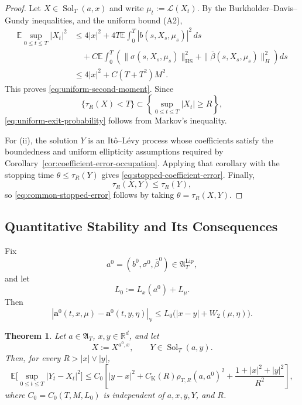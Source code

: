 \documentclass[12pt,oneside, reqno]{amsart}
\newtheorem{theorem}{Theorem}[section]
\numberwithin{equation}{section}
\begin{document}
	\begin{proof}
		Let $X\in\operatorname{Sol}_T(a,x)$ and write $\mu_t:=\mathcal L(X_t)$. By the Burkholder--Davis--Gundy	inequalities,	and the uniform bound \textnormal{(A2)},
		\[
		\begin{aligned}
			\mathbb E\sup_{0\leq t\leq T}|X_t|^2
			&\leq
			4|x|^2
			+
			4T\mathbb E\int_0^T
			|b(s,X_s,\mu_s)|^2\,ds
			\\
			&\quad+
			C\mathbb E\int_0^T
			\left(
			\|\sigma(s,X_s,\mu_s)\|_{\mathrm{HS}}^2
			+
			\|\overline\beta(s,X_s,\mu_s)\|_H^2
			\right)ds
			\\
			&\leq
			4|x|^2+C(T+T^2)M^2.
		\end{aligned}
		\]
		This proves \eqref{eq:uniform-second-moment}. Since
		\[
		\{\tau_R(X)<T\}
		\subset
		\left\{
		\sup_{0\leq t\leq T}|X_t|\geq R
		\right\},
		\]
		\eqref{eq:uniform-exit-probability} follows from Markov's
		inequality.
		
		For \textnormal{(ii)}, the solution $Y$ is an It\^o--L\'evy
		process whose coefficients satisfy the boundedness and uniform
		ellipticity assumptions required by
		Corollary~\ref{cor:coefficient-error-occupation}. Applying that
		corollary with the stopping time $\theta\leq\tau_R(Y)$ gives
		\eqref{eq:stopped-coefficient-error}. Finally,
		\[
		\tau_R(X,Y)\leq\tau_R(Y),
		\]
		so \eqref{eq:common-stopped-error} follows by taking
		$\theta=\tau_R(X,Y)$.
	\end{proof}
	
	
	\subsection{Quantitative Stability and Its Consequences}
	
	Fix
	\[
	a^0=(b^0,\sigma^0,\overline\beta^0)
	\in\mathfrak A_T^{\mathrm{Lip}},
	\]
	and let
	\[
	L_0:=L_x(a^0)+L_\mu.
	\]
	Then
	\begin{equation}
		\label{eq:full-core-lipschitz}
		\left|
		\mathbf a^0(t,x,\mu)
		-
		\mathbf a^0(t,y,\eta)
		\right|_{\mathbb V}
		\leq
		L_0\bigl(|x-y|+W_2(\mu,\eta)\bigr).
	\end{equation}
	
	\begin{theorem}
		\label{thm:quantitative-core-stability}
		Let $a\in\mathfrak A_T$, $x,y\in\mathbb R^d$, and let
		\[
		X:=X^{a^0,x}, \qquad	Y\in\operatorname{Sol}_T(a,y).
		\]
		Then, for every $R>|x|\vee|y|$,
		\begin{equation}
			\label{eq:quantitative-core-stability}
			\mathbb E\big[\sup_{0\leq t\leq T}|Y_t-X_t|^2\big]
			\leq	C_0\left[|y-x|^2+C_{\mathrm K}(R)\rho_{T,R}(a,a^0)^2+\frac{1+|x|^2+|y|^2}{R^2}
			\right],
		\end{equation}
		where \(C_0=C_0(T,M,L_0)\) is independent of $a,x,y,Y$, and $R$.
	\end{theorem}
	
\end{document}
